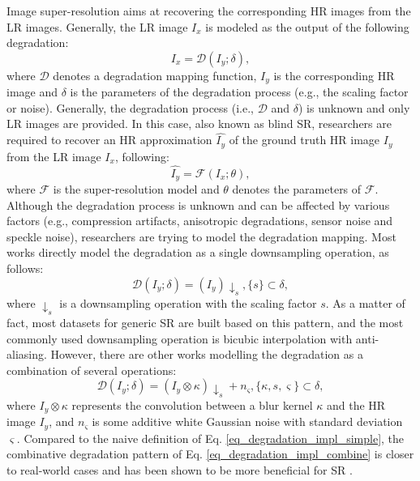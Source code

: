 \label{sec_problem_definitions}
Image super-resolution aims at recovering the corresponding HR images from the LR images.
Generally, the LR image $I_x$ is modeled as the output of the following degradation:
\begin{equation}
    I_x = \mathcal{D} (I_y ; \delta),
\end{equation}
where $\mathcal{D}$ denotes a degradation mapping function, $I_y$ is the corresponding HR image and $\delta$ is the parameters of the degradation process (e.g., the scaling factor or noise).
Generally, the degradation process (i.e., $\mathcal{D}$ and $\delta$) is unknown and only LR images are provided.
In this case, also known as blind SR, researchers are required to recover an HR approximation $\hat{I_y}$ of the ground truth HR image $I_y$ from the LR image $I_x$, following:
\begin{equation}
    \hat{I_y} = \mathcal{F} (I_x ; \theta),
\end{equation}
where $\mathcal{F}$ is the super-resolution model and $\theta$ denotes the parameters of $\mathcal{F}$.
Although the degradation process is unknown and can be affected by various factors (e.g., compression artifacts, anisotropic degradations, sensor noise and speckle noise), researchers are trying to model the degradation mapping.
Most works directly model the degradation as a single downsampling operation, as follows:
\begin{equation}
    \label{eq_degradation_impl_simple}
    \mathcal{D} (I_y ; \delta) = (I_y) \downarrow_s, \{s\} \subset \delta,
\end{equation}
where $\downarrow_s$ is a downsampling operation with the scaling factor $s$.
As a matter of fact, most datasets for generic SR are built based on this pattern, and the most commonly used downsampling operation is bicubic interpolation with anti-aliasing.
However, there are other works  modelling the degradation as a combination of several operations:
\begin{equation}
    \label{eq_degradation_impl_combine}
    \mathcal{D} (I_y ; \delta) = (I_y \otimes \kappa) \downarrow_s + n_\varsigma, \{\kappa,s,\varsigma\} \subset \delta,
\end{equation}
where $I_y \otimes \kappa$ represents the convolution between a blur kernel $\kappa$ and the HR image $I_y$, and $n_\varsigma$ is some additive white Gaussian noise with standard deviation $\varsigma$.
Compared to the naive definition of Eq. \ref{eq_degradation_impl_simple}, the combinative degradation pattern of Eq. \ref{eq_degradation_impl_combine} is closer to real-world cases and has been shown to be more beneficial for SR .
